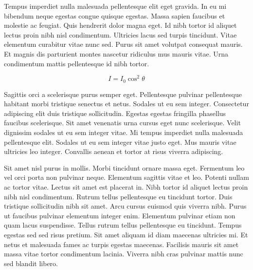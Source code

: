 \documentclass{article}
\begin{document}
    Tempus imperdiet nulla malesuada pellentesque elit eget gravida. In eu mi bibendum neque egestas congue quisque egestas. Massa sapien faucibus et molestie ac feugiat. Quis hendrerit dolor magna eget. Id nibh tortor id aliquet lectus proin nibh nisl condimentum. Ultricies lacus sed turpis tincidunt. Vitae elementum curabitur vitae nunc sed. Purus sit amet volutpat consequat mauris. Et magnis dis parturient montes nascetur ridiculus mus mauris vitae. Urna condimentum mattis pellentesque id nibh tortor.
    
    \begin{equation}
    	I=I_0\cos ^2\theta
    \end{equation}
    
    Sagittis orci a scelerisque purus semper eget. Pellentesque pulvinar pellentesque habitant morbi tristique senectus et netus. Sodales ut eu sem integer. Consectetur adipiscing elit duis tristique sollicitudin. Egestas egestas fringilla phasellus faucibus scelerisque. Sit amet venenatis urna cursus eget nunc scelerisque. Velit dignissim sodales ut eu sem integer vitae. Mi tempus imperdiet nulla malesuada pellentesque elit. Sodales ut eu sem integer vitae justo eget. Mus mauris vitae ultricies leo integer. Convallis aenean et tortor at risus viverra adipiscing.
    
    Sit amet nisl purus in mollis. Morbi tincidunt ornare massa eget. Fermentum leo vel orci porta non pulvinar neque. Elementum sagittis vitae et leo. Potenti nullam ac tortor vitae. Lectus sit amet est placerat in. Nibh tortor id aliquet lectus proin nibh nisl condimentum. Rutrum tellus pellentesque eu tincidunt tortor. Duis tristique sollicitudin nibh sit amet. Arcu cursus euismod quis viverra nibh. Purus ut faucibus pulvinar elementum integer enim. Elementum pulvinar etiam non quam lacus suspendisse. Tellus rutrum tellus pellentesque eu tincidunt. Tempus egestas sed sed risus pretium. Sit amet aliquam id diam maecenas ultricies mi. Et netus et malesuada fames ac turpis egestas maecenas. Facilisis mauris sit amet massa vitae tortor condimentum lacinia. Viverra nibh cras pulvinar mattis nunc sed blandit libero.
    
\end{document}
